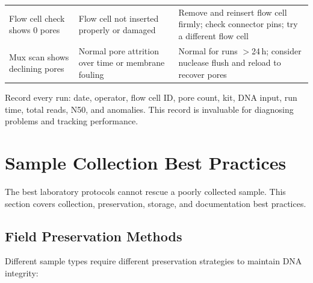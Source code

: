 \begin{longtable}{@{}p{3.5cm} p{4.5cm} p{6.5cm}@{}}
Flow cell check shows 0 pores & Flow cell not inserted properly or damaged & Remove and reinsert flow cell firmly; check connector pins; try a different flow cell \\
\addlinespace

Mux scan shows declining pores & Normal pore attrition over time or membrane fouling & Normal for runs $>$24\,h; consider nuclease flush and reload to recover pores \\

\end{longtable}

\begin{tipbox}[title={Keep a Sequencing Log}]
Record every run: date, operator, flow cell ID, pore count, kit, DNA input, run time, total reads, N50, and anomalies. This record is invaluable for diagnosing problems and tracking performance.
\end{tipbox}

\section{Sample Collection Best Practices}
\label{sec:protocols:collection}

The best laboratory protocols cannot rescue a poorly collected sample. This section covers collection, preservation, storage, and documentation best practices.

\subsection{Field Preservation Methods}
\label{subsec:protocols:preservation}

Different sample types require different preservation strategies to maintain DNA integrity:

